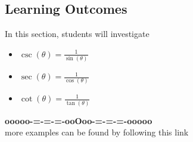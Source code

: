 \documentclass{ximera}
\begin{document}
\subsection*{Learning Outcomes}

\begin{sectionOutcomes}
In this section, students will investigate

\begin{itemize}
\item $\csc(\theta) = \frac{1}{\sin(\theta)}$
\item $\sec(\theta) = \frac{1}{\cos(\theta)}$
\item $\cot(\theta) = \frac{1}{\tan(\theta)}$
\end{itemize}
\end{sectionOutcomes}












\begin{center}
\textbf{\textcolor{green!50!black}{ooooo-=-=-=-ooOoo-=-=-=-ooooo}} \\

more examples can be found by following this link\\ 

\end{center}
\end{document}
